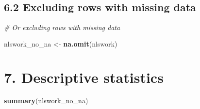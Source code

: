 \documentclass[
]{article}
\newenvironment{Shaded}{\begin{snugshade}}{\end{snugshade}}
\newcommand{\CommentTok}[1]{\textcolor[rgb]{0.56,0.35,0.01}{\textit{#1}}}
\newcommand{\FunctionTok}[1]{\textcolor[rgb]{0.13,0.29,0.53}{\textbf{#1}}}
\newcommand{\NormalTok}[1]{#1}
\newcommand{\OtherTok}[1]{\textcolor[rgb]{0.56,0.35,0.01}{#1}}
\begin{document}
\hypertarget{excluding-rows-with-missing-data}{%
\subsection{6.2 Excluding rows with missing
data}\label{excluding-rows-with-missing-data}}

\begin{Shaded}
\begin{Highlighting}[]
\CommentTok{\# Or excluding rows with missing data}

\NormalTok{nlswork\_no\_na }\OtherTok{\textless{}{-}} \FunctionTok{na.omit}\NormalTok{(nlswork)}
\end{Highlighting}
\end{Shaded}

\hypertarget{descriptive-statistics}{%
\section{7. Descriptive statistics}\label{descriptive-statistics}}

\begin{Shaded}
\begin{Highlighting}[]
\FunctionTok{summary}\NormalTok{(nlswork\_no\_na) }
\end{Highlighting}
\end{Shaded}
\end{document}
